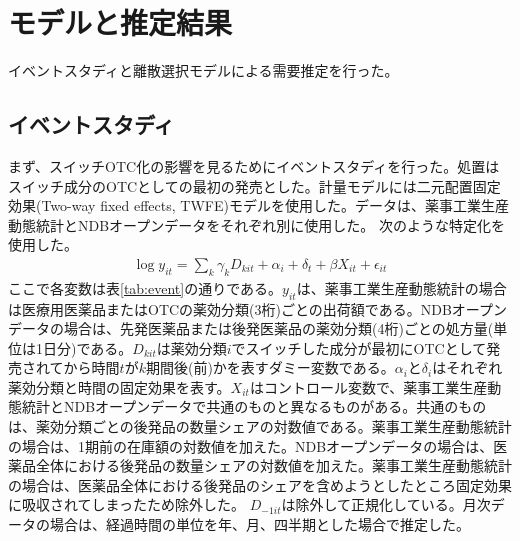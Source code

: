 \documentclass[a4paper,11pt,uplatex]{jsarticle}
\theoremstyle{definition}
\begin{document}
\section{モデルと推定結果}
イベントスタディと離散選択モデルによる需要推定を行った。
\subsection{イベントスタディ}
まず、スイッチOTC化の影響を見るためにイベントスタディを行った。処置はスイッチ成分のOTCとしての最初の発売とした。計量モデルには二元配置固定効果(Two-way fixed effects, TWFE)モデルを使用した。データは、薬事工業生産動態統計とNDBオープンデータをそれぞれ別に使用した。
次のような特定化を使用した。
\begin{align*}
\log y_{it} =\sum_k \gamma_k D_{kit}+\alpha_i +\delta_t+\beta X_{it}+\epsilon_{it}
\end{align*}
ここで各変数は表\ref{tab:event}の通りである。\(y_{it}\)は、薬事工業生産動態統計の場合は医療用医薬品またはOTCの薬効分類(3桁)ごとの出荷額である。NDBオープンデータの場合は、先発医薬品または後発医薬品の薬効分類(4桁)ごとの処方量(単位は1日分)である。\(D_{kit}\)は薬効分類\(i\)でスイッチした成分が最初にOTCとして発売されてから時間\(t\)が\(k\)期間後(前)かを表すダミー変数である。\(\alpha_i\)と\(\delta_i\)はそれぞれ薬効分類と時間の固定効果を表す。\(X_{it}\)はコントロール変数で、薬事工業生産動態統計とNDBオープンデータで共通のものと異なるものがある。共通のものは、薬効分類ごとの後発品の数量シェアの対数値である。薬事工業生産動態統計の場合は、1期前の在庫額の対数値を加えた。NDBオープンデータの場合は、医薬品全体における後発品の数量シェアの対数値を加えた。薬事工業生産動態統計の場合は、医薬品全体における後発品のシェアを含めようとしたところ固定効果に吸収されてしまったため除外した。
\(D_{-1it}\)は除外して正規化している。月次データの場合は、経過時間の単位を年、月、四半期とした場合で推定した。
\end{document}
